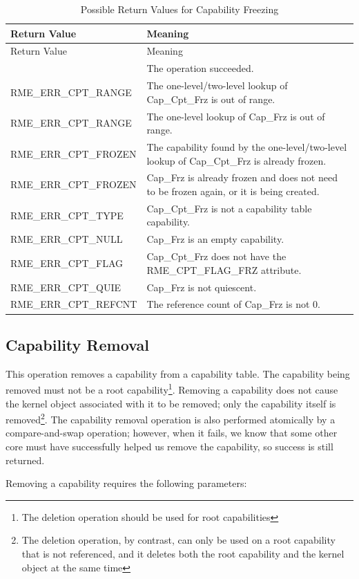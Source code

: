 \begin{xltabular}{\textwidth}{@{}>{\hsize\raggedright\arraybackslash}X>{\hsize\raggedright\arraybackslash}X@{}}
\caption{Possible Return Values for Capability Freezing}\label{tab:2-12-capability-freeze-return-values}\\
\toprule
Return Value & Meaning\tabularnewline
\endfirsthead
\toprule
Return Value & Meaning\tabularnewline
\midrule
\endhead
\bottomrule
{} & The operation succeeded.\tabularnewline
    RME\_ERR\_CPT\_RANGE & The one-level/two-level lookup of Cap\_Cpt\_Frz is out of range.\tabularnewline
    RME\_ERR\_CPT\_RANGE & The one-level lookup of Cap\_Frz is out of range.\tabularnewline
    RME\_ERR\_CPT\_FROZEN & The capability found by the one-level/two-level lookup of Cap\_Cpt\_Frz is already frozen.\tabularnewline
    RME\_ERR\_CPT\_FROZEN & Cap\_Frz is already frozen and does not need to be frozen again, or it is being created.\tabularnewline
    RME\_ERR\_CPT\_TYPE & Cap\_Cpt\_Frz is not a capability table capability.\tabularnewline
    RME\_ERR\_CPT\_NULL & Cap\_Frz is an empty capability.\tabularnewline
    RME\_ERR\_CPT\_FLAG & Cap\_Cpt\_Frz does not have the RME\_CPT\_FLAG\_FRZ attribute.\tabularnewline
    RME\_ERR\_CPT\_QUIE & Cap\_Frz is not quiescent.\tabularnewline
    RME\_ERR\_CPT\_REFCNT & The reference count of Cap\_Frz is not 0.\tabularnewline
\end{xltabular}
\nopagebreak[4]

\subsection{Capability Removal}\label{subsec:2-remove-a-capability}

This operation removes a capability from a capability table. The capability being removed must not be a root capability\footnote{The deletion operation should be used for root capabilities}. Removing a capability does not cause the kernel object associated with it to be removed; only the capability itself is removed\footnote{The deletion operation, by contrast, can only be used on a root capability that is not referenced, and it deletes both the root capability and the kernel object at the same time}. The capability removal operation is also performed atomically by a compare-and-swap operation; however, when it fails, we know that some other core must have successfully helped us remove the capability, so success is still returned.

Removing a capability requires the following parameters:

